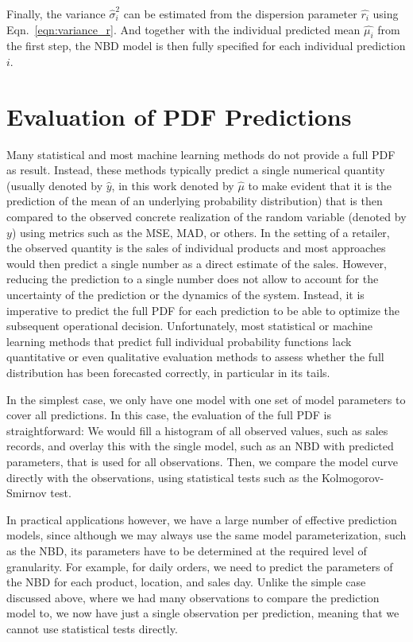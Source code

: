 \documentclass[BCOR=1mm, DIV=calc,10pt,
twoside=true,
twocolumn,
headings=normal]{scrartcl}
\newcommand{\eqn}{Eqn.~}
\begin{document}
Finally, the variance $\hat{\sigma}^2_i$ can be estimated from the dispersion parameter $\hat{r_i}$ using \eqn \eqref{eqn:variance_r}. And together with the individual predicted mean $\hat{\mu_i}$ from the first step, the NBD model is then fully specified for each individual prediction $i$.


\section{Evaluation of PDF Predictions}
\label{sec:pdfEvaluation}

Many statistical and most machine learning methods do not provide a full PDF as result. Instead, these methods typically predict a single numerical quantity (usually denoted by $\hat{y}$, in this work denoted by $\hat{\mu}$ to make evident that it is the prediction of the mean of an underlying probability distribution) that is then compared to the observed concrete realization of the random variable (denoted by $y$) using metrics such as the MSE, MAD, or others. In the setting of a retailer, the observed quantity is the sales of individual products and most approaches would then predict a single number as a direct estimate of the sales. However, reducing the prediction to a single number does not allow to account for the uncertainty of the prediction or the dynamics of the system. Instead, it is imperative to predict the full PDF for each prediction to be able to optimize the subsequent operational decision. Unfortunately, most statistical or machine learning methods that predict full individual probability functions lack quantitative or even qualitative evaluation methods to assess whether the full distribution has been forecasted correctly, in particular in its tails.

In the simplest case, we only have one model with one set of model parameters to cover all predictions. In this case, the evaluation of the full PDF is straightforward: We would fill a histogram of all observed values, such as sales records, and overlay this with the single model, such as an NBD with predicted parameters, that is used for all observations. Then, we compare the model curve directly with the observations, using statistical tests such as the Kolmogorov-Smirnov test.

In practical applications however, we have a large number of effective prediction models, since although we may always use the same model parameterization, such as the NBD, its parameters have to be determined at the required level of granularity. For example, for daily orders, we need to predict the parameters of the NBD for each product, location, and sales day. Unlike the simple case discussed above, where we had many observations to compare the prediction model to, we now have just a single observation per prediction, meaning that we cannot use statistical tests directly.
\end{document}
